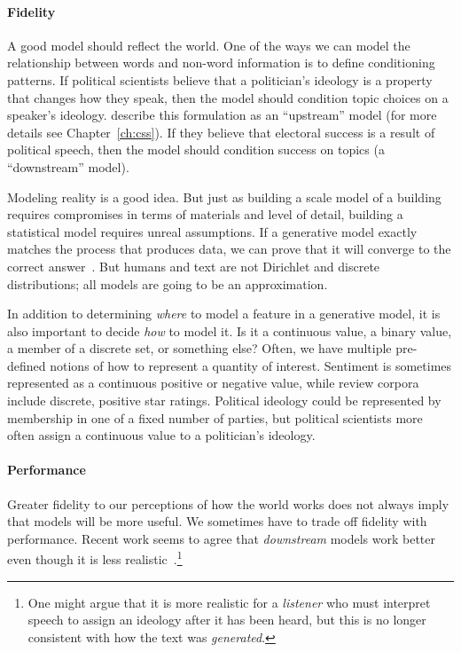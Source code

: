 \paragraph{Fidelity}

A good model should reflect the world. One of the ways we can model the relationship between words and non-word information is to define conditioning patterns.
If political scientists believe that a politician's ideology is a property that changes how they speak, then the model should condition topic choices on a speaker's ideology.
\cite{mimno-08} describe this formulation as an ``upstream'' model (for more details see Chapter~\ref{ch:css}).
If they believe that electoral success is a result of political speech, then the model should condition success on topics (a ``downstream'' model).

Modeling reality is a good idea. But just as building a scale model of a building requires compromises in terms of materials and level of detail, building a statistical model requires unreal assumptions.
If a generative model exactly
matches the process that produces data, we can prove that it will
converge to the correct answer~\citep{neal-93}.
But humans and text are
not Dirichlet and discrete distributions; all models are going to
be an approximation.

In addition to determining \emph{where} to model a feature in a
generative model, it is also important to decide \emph{how} to model
it.  Is it a continuous value, a binary value, a member of a discrete
set, or something else?  Often, we have multiple pre-defined notions of how to
represent a quantity of interest.
Sentiment is sometimes represented as a continuous positive or negative value, while review corpora include discrete, positive star ratings.
Political ideology could be represented by membership in one of a fixed number of
parties, but political scientists more often assign a continuous value to a
politician's ideology.

\paragraph{Performance}

Greater fidelity to our perceptions of how the world works does not always imply that models will be more  useful.
We sometimes have to trade off fidelity with performance.
Recent work seems to agree that \emph{downstream} models work better even though it is
less realistic~\citep{nguyen-13:shlda}.\footnote{One might argue that it is more realistic for
  a \emph{listener} who must interpret speech to assign an ideology
  after it has been heard, but this is no longer consistent with how
  the text was \emph{generated}.} 

